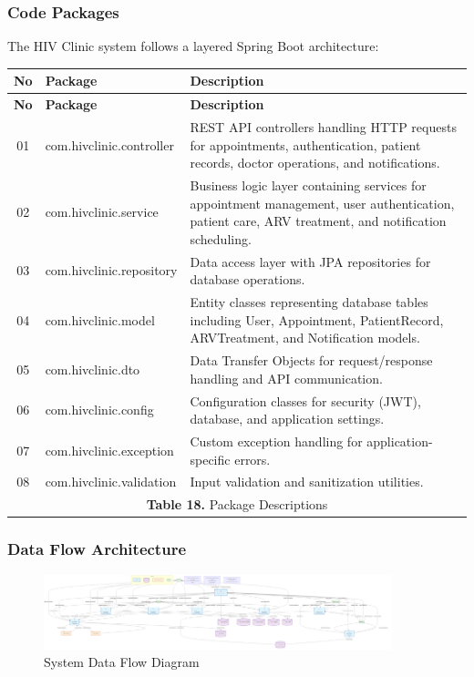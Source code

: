 \documentclass[12pt,a4paper]{article}
\begin{document}
\subsubsection{Code Packages}

The HIV Clinic system follows a layered Spring Boot architecture:
\renewcommand{\arraystretch}{1.4}
\begin{longtable}{|c|p{6cm}|p{8cm}|}
\hline
\textbf{No} & \textbf{Package} & \textbf{Description} \\
\hline
\endfirsthead

\hline
\textbf{No} & \textbf{Package} & \textbf{Description} \\
\hline
\endhead

01 & com.hivclinic.controller & REST API controllers handling HTTP requests for appointments, authentication, patient records, doctor operations, and notifications. \\
\hline
02 & com.hivclinic.service & Business logic layer containing services for appointment management, user authentication, patient care, ARV treatment, and notification scheduling. \\
\hline
03 & com.hivclinic.repository & Data access layer with JPA repositories for database operations. \\
\hline
04 & com.hivclinic.model & Entity classes representing database tables including User, Appointment, PatientRecord, ARVTreatment, and Notification models. \\
\hline
05 & com.hivclinic.dto & Data Transfer Objects for request/response handling and API communication. \\
\hline
06 & com.hivclinic.config & Configuration classes for security (JWT), database, and application settings. \\
\hline
07 & com.hivclinic.exception & Custom exception handling for application-specific errors. \\
\hline
08 & com.hivclinic.validation & Input validation and sanitization utilities. \\
\hline
\multicolumn{3}{|c|}{\textbf{Table 18.} Package Descriptions} \\
\hline
\end{longtable}

\subsubsection{Data Flow Architecture}
\begin{figure}[H]
\centering
\includegraphics[width=0.9\textwidth]{diagrams/data_flow_diagram.png}
\caption{System Data Flow Diagram}
\label{fig:data-flow-diagram}
\end{figure}
\end{document}
